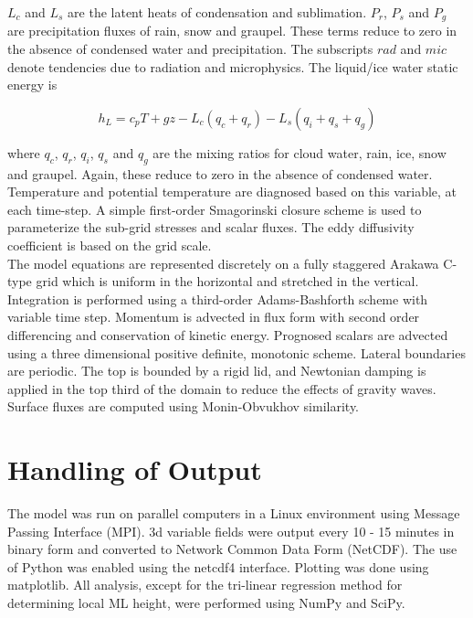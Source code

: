 $L_{c}$ and $L_{s}$ are the latent heats of condensation and sublimation.  $P_{r}$, $P_{s}$ and $P_{g}$ are precipitation fluxes of rain, snow and graupel.  These terms reduce to zero in the absence of condensed water and precipitation.  The subscripts $rad$ and $mic$ denote tendencies due to radiation and microphysics.  The liquid/ice water static energy is

\begin{equation}
h_{L} = c_{p}T + gz - L_{c}(q_{c} + q_{r}) - L_{s}(q_{i} + q_{s} + q_{g}) 
\end{equation}

where $q_{c}$, $q_{r}$, $q_{i}$, $q_{s}$ and $q_{g}$ are the mixing ratios for cloud water, rain, ice, snow and graupel.  Again, these reduce to zero in the absence of condensed water.  Temperature and potential temperature are diagnosed based on this variable, at each time-step.  A simple first-order Smagorinski closure scheme is used to parameterize the sub-grid stresses and scalar fluxes. The eddy diffusivity coefficient is based on the grid scale.\\

The model equations are represented discretely on a fully staggered Arakawa C-type grid which is uniform in the horizontal and stretched in the vertical. Integration is performed using a third-order Adams-Bashforth scheme with variable time step.  Momentum is advected in flux form with second order differencing and conservation of kinetic energy. 
Prognosed scalars are advected using a three dimensional positive definite, monotonic scheme.  Lateral boundaries are periodic.  The top is bounded by a rigid lid, and
Newtonian damping is applied in the top third of the domain to reduce the effects of gravity waves.  Surface fluxes are computed using Monin-Obvukhov similarity.\\

\section{Handling of Output}

The model was run on parallel computers in a Linux environment using Message Passing Interface (MPI). 3d variable fields were output every 10 - 15 minutes in binary form and converted to Network Common Data Form (NetCDF).  The use of Python was enabled using the netcdf4 interface.  Plotting was done using matplotlib. All analysis, except for the tri-linear regression method for determining local \acs{ML} height, were performed using NumPy and SciPy.

